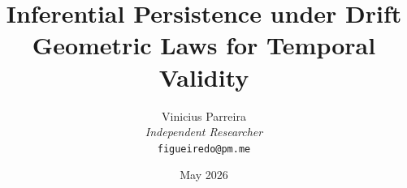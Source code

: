 \title{%
  \textbf{Inferential Persistence under Drift}\\[4pt]
  \normalsize Geometric Laws for Temporal Validity
}

\author{%
  Vinicius Parreira\hspace{0.18em}\\[2pt]
  \small\textit{Independent Researcher}\\
  \small\texttt{figueiredo@pm.me}
}

\date{May 2026}
